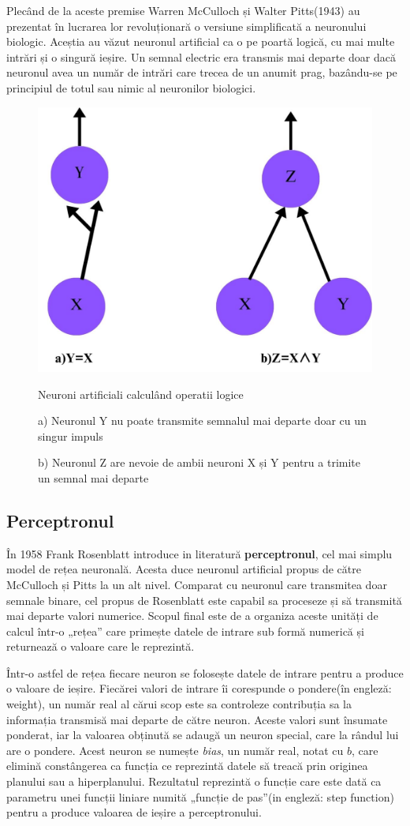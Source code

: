     Plecând de la aceste premise Warren McCulloch și Walter Pitts(1943) 
    \cite{mcculloch1943logical} au prezentat în lucrarea lor revoluționară o versiune simplificată a neuronului biologic. Aceștia au văzut neuronul artificial ca o pe poartă logică, cu mai multe intrări și o singură ieșire. Un semnal electric era transmis mai departe doar dacă neuronul avea un număr de intrări care trecea de un anumit prag, bazându-se pe principiul de totul sau nimic al neuronilor biologici.  

     \begin{figure}[h]
         \centering 
         \includegraphics[width=.5\textwidth]{images/artificial-neurons-as-logic-gates.jpg}
         \captionsetup{font=footnotesize}
         \caption{Neuroni artificiali calculând operatii logice}
         \caption*{a) Neuronul Y nu poate transmite semnalul mai departe              doar cu un singur impuls}
         \caption*{b) Neuronul Z are nevoie de ambii neuroni X și Y pentru a trimite un semnal mai departe}
    \end{figure}

    \newpage

\subsection{Perceptronul}

În 1958 Frank Rosenblatt \cite{rosenblatt1958perceptron} introduce in literatură \textbf{perceptronul}, cel mai simplu model de rețea neuronală. Acesta duce neuronul artificial propus de către McCulloch și Pitts \cite{mcculloch1943logical} la un alt nivel. Comparat cu neuronul care transmitea doar semnale binare, cel propus de Rosenblatt este capabil sa proceseze și să transmită mai departe valori numerice. Scopul final este de a organiza aceste unități de calcul într-o „rețea” care primește datele de intrare sub formă numerică și returnează o valoare care le reprezintă. 

Într-o astfel de rețea fiecare neuron se folosește datele de intrare pentru a produce o valoare de ieșire. Fiecărei valori de intrare îi corespunde o pondere(în engleză: weight), un număr real al cărui scop este sa controleze contribuția sa la informația transmisă mai departe de către neuron. Aceste valori sunt însumate ponderat, iar la valoarea obținută se adaugă un neuron special, care la rândul lui are o pondere. Acest neuron se numește \textit{bias}, un număr real, notat cu $b$, care elimină constângerea ca funcția ce reprezintă datele să treacă prin originea planului sau a hiperplanului. Rezultatul reprezintă o funcție care este dată ca parametru unei funcții liniare numită „funcție de pas”(in engleză: step function) pentru a produce valoarea de ieșire a perceptronului. 

